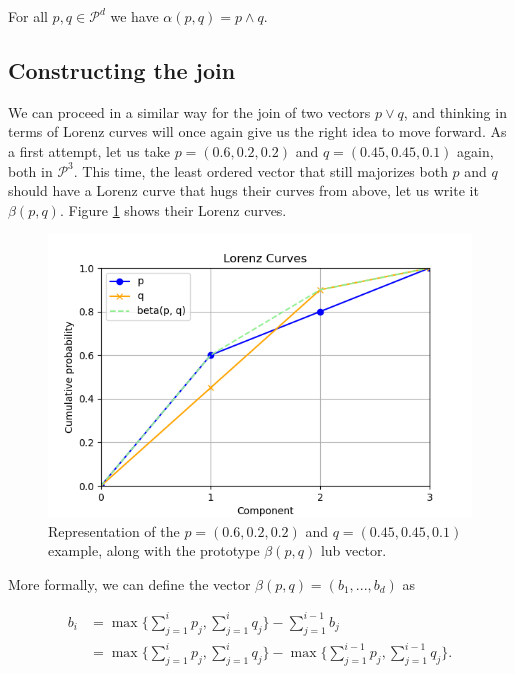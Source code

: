 \begin{lemma} \label{lem:meet}
    For all $p, q \in \mathcal{P}^d$ we have $\alpha(p, q) = p \wedge q$.
\end{lemma}



\subsection{Constructing the join} \label{sec:join}

We can proceed in a similar way for the join of two vectors $p \vee q$, and thinking in terms of Lorenz curves will once again give us the right idea to move forward. As a first attempt, let us take $p = (0.6, 0.2, 0.2)$ and $q = (0.45, 0.45, 0.1)$ again, both in $\mathcal{P}^3$. This time, the least ordered vector that still majorizes both $p$ and $q$ should have a Lorenz curve that hugs their curves from above, let us write it $\beta(p, q)$. Figure \ref{fig:join_naive_attempt} shows their Lorenz curves.

\begin{figure}[h!] 
    \centering
    \includegraphics[scale=0.6]{images/join_naive_attempt.png}
    \caption{Representation of the $p = (0.6, 0.2, 0.2)$ and $q = (0.45, 0.45, 0.1)$ example, along with the prototype $\beta(p, q)$ lub vector.} \label{fig:join_naive_attempt}
\end{figure}

\noindent More formally, we can define the vector $\beta(p, q) = (b_1, ..., b_d)$ as 

\begin{align}
    b_i &= \max \Big\{ \sum_{j=1}^{i} p_j , \sum_{j=1}^{i} q_j \Big\} - \sum_{j=1}^{i-1} b_j \label{eq:beta_bis} \\
    &= \max \Big\{ \sum_{j=1}^{i} p_j , \sum_{j=1}^{i} q_j \Big\} - \max \Big\{ \sum_{j=1}^{i-1} p_j , \sum_{j=1}^{i-1} q_j \Big\}. \label{eq:beta}
\end{align}

